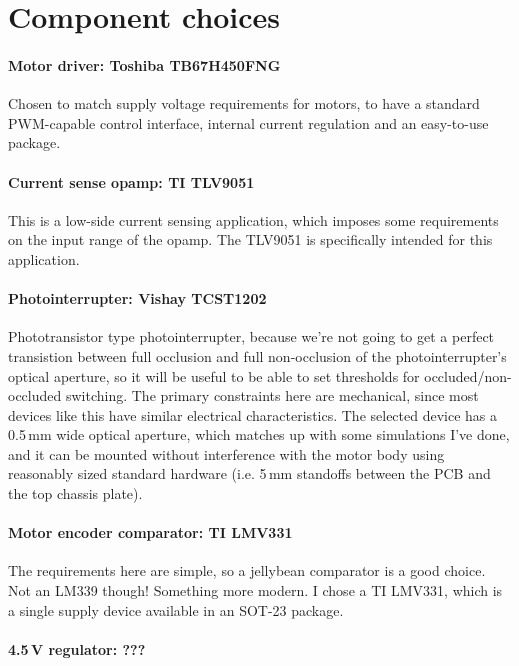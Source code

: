 \documentclass[a4paper,11pt,article]{memoir}
\begin{document}
\section*{Component choices}

\paragraph{Motor driver: Toshiba TB67H450FNG}

Chosen to match supply voltage requirements for motors, to have a
standard PWM-capable control interface, internal current regulation
and an easy-to-use package.

\paragraph{Current sense opamp: TI TLV9051}

This is a low-side current sensing application, which imposes some
requirements on the input range of the opamp. The TLV9051 is
specifically intended for this application.

\paragraph{Photointerrupter: Vishay TCST1202}

Phototransistor type photointerrupter, because we're not going to get
a perfect transistion between full occlusion and full non-occlusion of
the photointerrupter's optical aperture, so it will be useful to be
able to set thresholds for occluded/non-occluded switching. The
primary constraints here are mechanical, since most devices like this
have similar electrical characteristics. The selected device has a
0.5\,mm wide optical aperture, which matches up with some simulations
I've done, and it can be mounted without interference with the motor
body using reasonably sized standard hardware (i.e. 5\,mm standoffs
between the PCB and the top chassis plate).

\paragraph{Motor encoder comparator: TI LMV331}

The requirements here are simple, so a jellybean comparator is a good
choice. Not an LM339 though! Something more modern. I chose a TI
LMV331, which is a single supply device available in an SOT-23 package.

\paragraph{4.5\,V regulator: ???}
\end{document}
